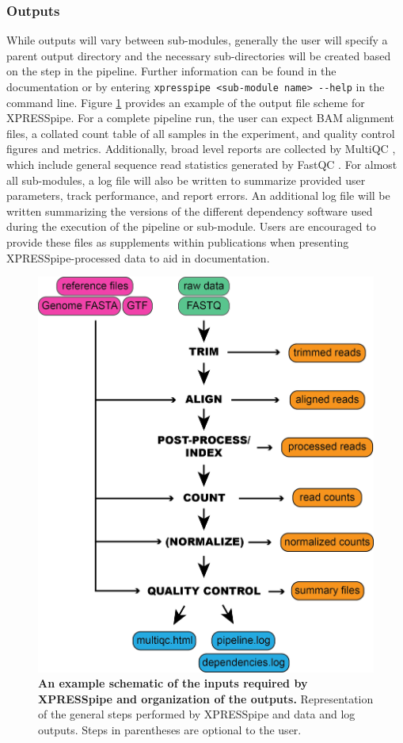 \documentclass[10pt, oneside]{article}
\begin{document}
\subsubsection{Outputs}
While outputs will vary between sub-modules, generally the user will specify a parent output directory and the necessary sub-directories will be created based on the step in the pipeline. Further information can be found in the documentation \cite{xpresspipe_docs} or by entering \texttt{xpresspipe \textless sub-module name\textgreater \ -{}-help} in the command line. Figure \ref{fig:outputs} provides an example of the output file scheme for XPRESSpipe. For a complete pipeline run, the user can expect BAM alignment files, a collated count table of all samples in the experiment, and quality control figures and metrics. Additionally, broad level reports are collected by MultiQC \cite{multiqc}, which include general sequence read statistics generated by FastQC \cite{fastqc}. For almost all sub-modules, a log file will also be written to summarize provided user parameters, track performance, and report errors. An additional log file will be written summarizing the versions of the different dependency software used during the execution of the pipeline or sub-module. Users are encouraged to provide these files as supplements within publications when presenting XPRESSpipe-processed data to aid in documentation.

\begin{figure}
\centering
  \includegraphics[width=120mm]{figures/xpresspipe_figure1.png}
  \caption{\textbf{An example schematic of the inputs required by XPRESSpipe and organization of the outputs.} Representation of the general steps performed by XPRESSpipe and data and log outputs. Steps in parentheses are optional to the user.}
  \label{fig:outputs}
\end{figure}
\end{document}
